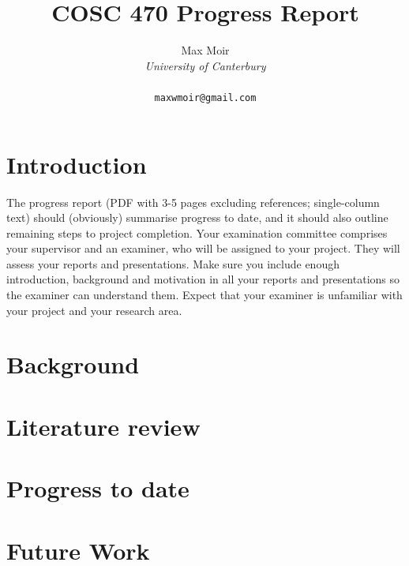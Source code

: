 \documentclass{article}
\title{COSC 470 Progress Report}
\author{
    Max Moir \\
    \textit{University of Canterbury} \\ 
    \text{Christchurch, New Zealand} \\ 
    \texttt{maxwmoir@gmail.com}
}
\theoremstyle{definition}
\begin{document}
\maketitle

\section{Introduction}
The progress report (PDF with 3-5 pages excluding references; single-column text) should (obviously) summarise progress to date, and it should also outline remaining steps to project completion. Your examination committee comprises your supervisor and an examiner, who will be assigned to your project. They will assess your reports and presentations. Make sure you include enough introduction, background and motivation in all your reports and presentations so the examiner can understand them. Expect that your examiner is unfamiliar with your project and your research area.

\section{Background}

\section{Literature review}

\section{Progress to date}

\section{Future Work}
\end{document}
